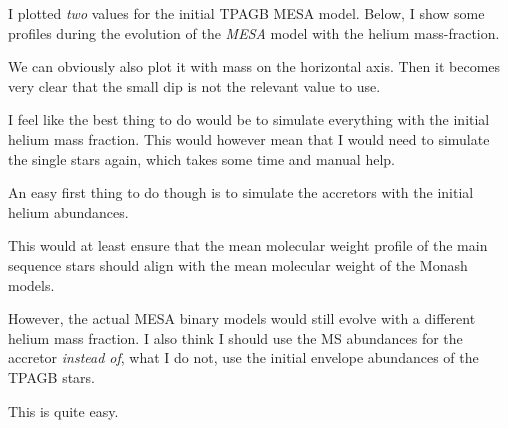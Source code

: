 \documentclass[a4paper,10pt]{article}
\begin{document}
I plotted \emph{two} values for the initial TPAGB MESA model.
Below, I show some profiles during the
evolution of the \emph{MESA} model with the \citet{karakas2014} helium mass-fraction.

\begin{figure}[ht]
	\centering
\end{figure}

We can obviously also plot it with mass on the horizontal axis.
Then it becomes very
clear that the small dip is not the relevant value to use.

\begin{figure}[ht]
	\centering
\end{figure}

I feel like the best thing to do would be to simulate everything with the \citet{karakas2014} initial helium
mass fraction.
This would however mean that I would need to simulate the single stars again, which
takes some time and manual help.

An easy first thing to do though is to simulate the accretors with the \citet{karakas2014} initial helium abundances.

This would at least ensure that the mean molecular weight profile of the main sequence stars should
align with the mean molecular weight of the Monash models.

However, the actual MESA binary models would still evolve with a different helium mass fraction.
I also think I should use the \citet{asplund2009} MS abundances for the accretor \emph{instead of}, what I do not,
use the initial envelope abundances of the TPAGB stars.

This is quite easy.

\begin{figure}[ht]
	\centering
\end{figure}

\nextpage
\end{document}
